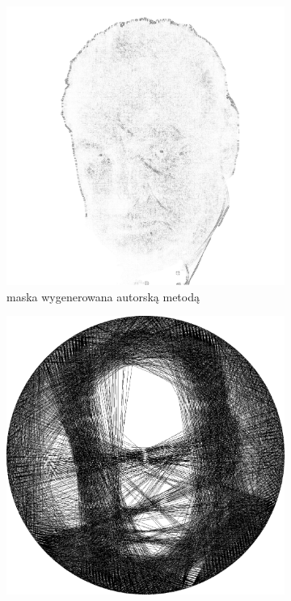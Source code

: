 \begin{figure}[H]
\begin{subfigure}{0.30\textwidth}
        \includegraphics[width = \textwidth]{img/6-comp/churchill_mask_c20_inv0_bg1_obj1_ed1.png}
        \caption{maska wygenerowana autorską metodą}
        \label{comp-comp-churchill-c}
    \end{subfigure}
    \begin{subfigure}{0.30\textwidth}
        \centering
        \includegraphics[width = \textwidth]{img/6-comp/churchill_e_i2500_c20_inv0_bg1_obj1_ed1.png}

\end{subfigure}
\end{figure}
